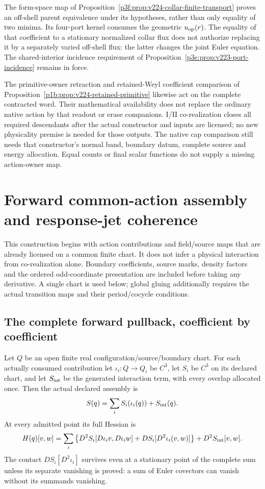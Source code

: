 \documentclass[12pt,a4paper]{article}
\begin{document}
The form-space map of Proposition~\ref{p3f:prop:v224-collar-finite-transport}
proves an off-shell parent equivalence under its hypotheses, rather than
only equality of two minima. Its four-port kernel consumes the geometric
$u_{\rm op}(r)$. The equality of that coefficient to a stationary
normalized collar flux does not authorize replacing it by a separately
varied off-shell flux: the latter changes the joint Euler equation.
The shared-interior incidence requirement of
Proposition~\ref{p3e:prop:v223-port-incidence} remains in force.

The primitive-owner retraction and retained-Weyl coefficient comparison
of Proposition~\ref{p1b:prop:v224-retained-primitive} likewise act on
the complete contracted word. Their mathematical availability does not
replace the ordinary native action by that readout or erase companions.
I/II co-realization closes all required descendants after the actual
constructor and inputs are licensed; no new physicality premise is
needed for those outputs. The native cap comparison still needs that
constructor's normal band, boundary datum, complete source and energy
allocation. Equal counts or final scalar functions do not supply a
missing action-owner map.



\section{Forward common-action assembly and response-jet coherence}
\label{p3a:v251:sec:coherence}

This construction begins with action contributions and field/source maps
that are already licensed on a common finite chart.  It does not infer a
physical interaction from co-realization alone.  Boundary coefficients,
source marks, density factors and the ordered odd-coordinate presentation
are included before taking any derivative.  A single chart is used below;
global gluing additionally requires the actual transition maps and their
period/cocycle conditions.

\subsection{The complete forward pullback, coefficient by coefficient}
Let $Q$ be an open finite real configuration/source/boundary chart.
For each actually consumed contribution let $\iota_i:Q\to Q_i$ be
$C^3$, let $S_i$ be $C^3$ on its declared chart, and let $S_{\rm int}$
be the generated interaction term, with every overlap allocated once.
Then the actual declared assembly is
\[
 S(q)=\sum_i S_i(\iota_i(q))+S_{\rm int}(q).
\]
At every admitted point its full Hessian is
\begin{equation}
\label{p3a:v251:eq:full-pullback-hessian}
 H(q)[v,w]=\sum_i\left\{
 D^2S_i[D\iota_i v,D\iota_i w]
       +DS_i[D^2\iota_i(v,w)]\right\}
       +D^2S_{\rm int}[v,w].
\end{equation}
The contact $DS_i[D^2\iota_i]$ survives even at a stationary point of
the complete sum unless its separate vanishing is proved: a sum of
Euler covectors can vanish without its summands vanishing.
\end{document}
